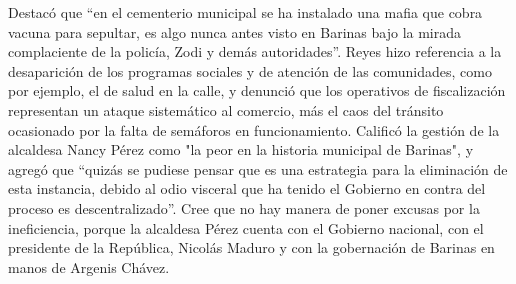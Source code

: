 \documentclass{article}%
\begin{document}
%
Destacó que “en el cementerio municipal se ha instalado una mafia que cobra vacuna para sepultar, es algo nunca antes visto en Barinas bajo la mirada complaciente de la policía, Zodi y demás autoridades”.%
\newline%
%
Reyes hizo referencia a la desaparición de los programas sociales y de atención de las comunidades, como por ejemplo, el de salud en la calle, y denunció que los operativos de fiscalización representan un ataque sistemático al comercio, más el caos del tránsito ocasionado por la falta de semáforos en funcionamiento.%
\newline%
%
Calificó la gestión de la alcaldesa Nancy Pérez como "la peor en la historia municipal de Barinas", y agregó que “quizás se pudiese pensar que es una estrategia para la eliminación de esta instancia, debido al odio visceral que ha tenido el Gobierno en contra del proceso es descentralizado”.%
\newline%
%
Cree que no hay manera de poner excusas por la ineficiencia, porque la alcaldesa Pérez cuenta con el Gobierno nacional, con el presidente de la República, Nicolás Maduro y con la gobernación de Barinas en manos de Argenis Chávez.%
\newline%
%
\end{document}
